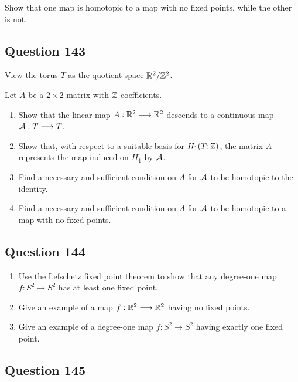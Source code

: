 \documentclass[12pt]{article}
\begin{document}
Show that one map is homotopic to a map with no fixed points, while the
other is not.

\hypertarget{question-143}{%
\subsection{Question 143}\label{question-143}}

View the torus \(T\) as the quotient space \({\mathbb{R}}^2 /{\mathbb{Z}}^2\).

Let \(A\) be a \(2 \times 2\) matrix with \({\mathbb{Z}}\) coefficients.

\begin{enumerate}
\def\labelenumi{\alph{enumi}.}
\item
  Show that the linear map \(A : {\mathbb{R}}^2 \longrightarrow {\mathbb{R}}^2\) descends to a
  continuous map \({\mathcal{A}} : T \longrightarrow T\).
\item
  Show that, with respect to a suitable basis for \(H_1 (T ; {\mathbb{Z}})\), the
  matrix \(A\) represents the map induced on \(H_1\) by \({\mathcal{A}}\).
\item
  Find a necessary and sufficient condition on \(A\) for \({\mathcal{A}}\) to be
  homotopic to the identity.
\item
  Find a necessary and sufficient condition on \(A\) for \({\mathcal{A}}\) to be
  homotopic to a map with no fixed points.
\end{enumerate}

\hypertarget{question-144}{%
\subsection{Question 144}\label{question-144}}

\begin{enumerate}
\def\labelenumi{\alph{enumi}.}
\item
  Use the Lefschetz fixed point theorem to show that any degree-one map
  \(f : S^2 \to S^2\) has at least one fixed point.
\item
  Give an example of a map \(f : {\mathbb{R}}^2 \longrightarrow {\mathbb{R}}^2\) having no fixed
  points.
\item
  Give an example of a degree-one map \(f : S^2 \to S^2\) having exactly
  one fixed point.
\end{enumerate}

\hypertarget{question-145}{%
\subsection{Question 145}\label{question-145}}
\end{document}

